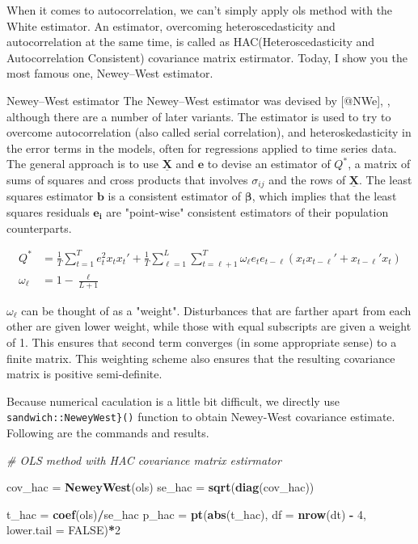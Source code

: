 \documentclass[
  12pt,
]{article}
\newenvironment{Shaded}{\begin{snugshade}}{\end{snugshade}}
\newcommand{\CommentTok}[1]{\textcolor[rgb]{0.56,0.35,0.01}{\textit{#1}}}
\newcommand{\DataTypeTok}[1]{\textcolor[rgb]{0.13,0.29,0.53}{#1}}
\newcommand{\DecValTok}[1]{\textcolor[rgb]{0.00,0.00,0.81}{#1}}
\newcommand{\KeywordTok}[1]{\textcolor[rgb]{0.13,0.29,0.53}{\textbf{#1}}}
\newcommand{\NormalTok}[1]{#1}
\newcommand{\OperatorTok}[1]{\textcolor[rgb]{0.81,0.36,0.00}{\textbf{#1}}}
\newcommand{\OtherTok}[1]{\textcolor[rgb]{0.56,0.35,0.01}{#1}}
\newcommand{\StringTok}[1]{\textcolor[rgb]{0.31,0.60,0.02}{#1}}
\begin{document}
When it comes to autocorrelation, we can't simply apply ols method with the White estimator. An estimator, overcoming heteroscedasticity and autocorrelation at the same time, is called as HAC(Heteroscedasticity and Autocorrelation Consistent) covariance matrix estirmator. Today, I show you the most famous one, Newey--West estimator.

\begin{itembox}[1]{Newey–West estimator}
The Newey–West estimator was devised by [@NWe], , although there are a number of later variants. The estimator is used to try to overcome autocorrelation (also called serial correlation), and heteroskedasticity in the error terms in the models, often for regressions applied to time series data.
The general approach is to use $\underline{\mathbf{X}}$ and $\mathbf{e}$ to devise an estimator of $Q^{*}$,  a matrix of sums of squares and cross products that involves $\sigma_{ij}$ and the rows of $\underline{\mathbf{X}}$. The least squares estimator $\mathbf{b}$ is a consistent estimator of $\mathbf{\beta}$, which implies that the least squares residuals $\mathbf{e_i}$ are "point-wise" consistent estimators of their population counterparts.

\begin{align*}
    Q^{*} & = \frac{1}{T}\sum_{t=1}^{T}e_t^2 x_t x_t ' + \frac{1}{T}\sum_{\ell=1}^{L}\sum_{t=\ell+1}^{T}\omega_{\ell}e_t e_{t-\ell}(x_t x_{t-\ell}' + x_{t-\ell}' x_t ) \\
    \omega_{\ell} & = 1 - \frac{\ell}{L+1}
\end{align*}

$\omega_{\ell}$ can be thought of as a "weight". Disturbances that are farther apart from each other are given lower weight, while those with equal subscripts are given a weight of 1. This ensures that second term converges (in some appropriate sense) to a finite matrix. This weighting scheme also ensures that the resulting covariance matrix is positive semi-definite.
\end{itembox}

Because numerical caculation is a little bit difficult, we directly use \texttt{sandwich::NeweyWest\}()} function to obtain Newey-West covariance estimate. Following are the commands and results.

\begin{Shaded}
\begin{Highlighting}[]
\CommentTok{\# OLS method with HAC covariance matrix estirmator}

\NormalTok{cov\_hac =}\StringTok{ }\KeywordTok{NeweyWest}\NormalTok{(ols)}
\NormalTok{se\_hac =}\StringTok{ }\KeywordTok{sqrt}\NormalTok{(}\KeywordTok{diag}\NormalTok{(cov\_hac))}

\NormalTok{t\_hac =}\StringTok{ }\KeywordTok{coef}\NormalTok{(ols)}\OperatorTok{/}\NormalTok{se\_hac}
\NormalTok{p\_hac =}\StringTok{ }\KeywordTok{pt}\NormalTok{(}\KeywordTok{abs}\NormalTok{(t\_hac), }\DataTypeTok{df =} \KeywordTok{nrow}\NormalTok{(dt) }\OperatorTok{{-}}\StringTok{ }\DecValTok{4}\NormalTok{, }\DataTypeTok{lower.tail =} \OtherTok{FALSE}\NormalTok{)}\OperatorTok{*}\DecValTok{2}
\end{Highlighting}
\end{Shaded}
\end{document}
